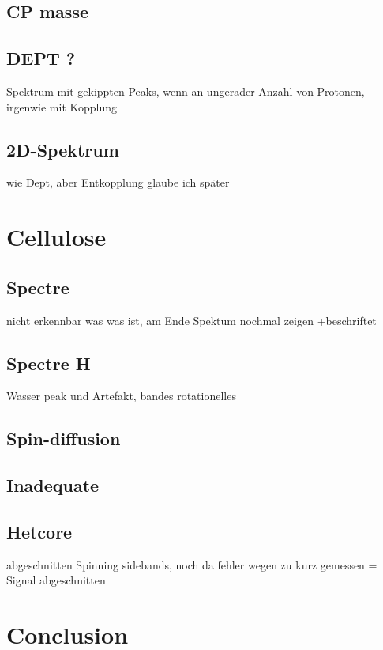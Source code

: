\documentclass[a4paper,12pt]{scrartcl}
\begin{document}
  \subsection{CP masse}

  \subsection{DEPT ?}
   Spektrum mit gekippten Peaks, wenn an ungerader Anzahl von Protonen, irgenwie mit Kopplung

  \subsection{2D-Spektrum}
   wie Dept, aber Entkopplung glaube ich später
 
 

 \section{Cellulose}
  \subsection{Spectre }
   nicht erkennbar was was ist, am Ende Spektum nochmal zeigen +beschriftet  

  \subsection{Spectre H}
   Wasser peak und Artefakt, bandes rotationelles

  \subsection{Spin-diffusion}
  
  \subsection{Inadequate}

  \subsection{Hetcore}
 
   abgeschnitten Spinning sidebands, noch da fehler wegen zu kurz gemessen = Signal abgeschnitten
 
 

 \section{Conclusion}
 
 
\end{document}
